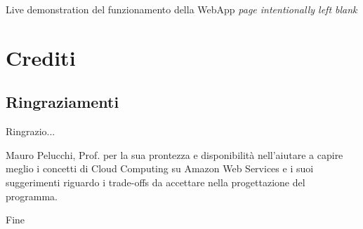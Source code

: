 \documentclass[xcolor=svgnames, aspectratio=169]{beamer}
\begin{document}
\begin{frame}{Live demonstration del funzionamento della WebApp}
    \hspace*{150pt}\emph{page intentionally left blank}
\end{frame}


\section{Crediti}

\begin{frame}{\secname}
    \tableofcontents[sections={\thesection}, subsubsectionstyle=show, sectionstyle=hide]
\end{frame}


\subsection{Ringraziamenti}

\begin{frame}{Ringrazio...}
    \begin{block}{Mauro Pelucchi, Prof.}
        per la sua prontezza e disponibilità nell'aiutare a capire meglio i concetti di Cloud Computing su Amazon Web Services e i suoi suggerimenti riguardo i trade-offs da accettare nella progettazione del programma.
    \end{block}
\end{frame}


\begin{frame}{Fine}
    \begin{figure}[H]
        \vspace*{-6ex}
        \centering
        \noindent
    \end{figure}
\end{frame}
\end{document}
